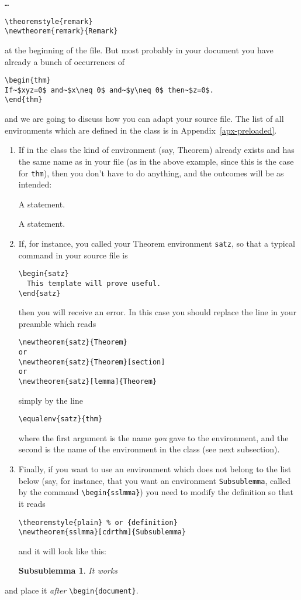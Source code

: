\documentclass[IGT,Unicode]{cedram}
\begin{document}
\noindent\texttt{\dots}
\begin{verbatim}
\theoremstyle{remark}
\newtheorem{remark}{Remark}
\end{verbatim}
at the beginning of the file. But most probably in your document you have already a bunch of occurrences of
\begin{verbatim}
\begin{thm}
If~$xyz=0$ and~$x\neq 0$ and~$y\neq 0$ then~$z=0$.
\end{thm}
\end{verbatim}
and we are going to discuss how you can adapt your source file. The list of all environments which are defined in the class is in Appendix~\ref{apx-preloaded}.
\begin{enumerate}
\item \label{equal} If in the class the kind of environment (say, Theorem) already exists and has the same name as in your file (as in the above example, since this is the case for \verb|thm|), then you don't have to do anything, and the outcomes will be as intended:
  \begin{thm}\label{thm:1}
   A statement. 
  \end{thm}
  \begin{prop}\label{prop:1}
   A statement. 
  \end{prop}
\item \label{equalenv} If, for instance, you called your Theorem environment \verb|satz|, so that a typical command in your source file is
\begin{verbatim}
\begin{satz}
  This template will prove useful.
\end{satz}
\end{verbatim}
  then you will receive an error. In this case you should replace the
  line in your preamble which reads
\begin{verbatim}
\newtheorem{satz}{Theorem}
or
\newtheorem{satz}{Theorem}[section]
or
\newtheorem{satz}[lemma]{Theorem}
\end{verbatim}
simply by the line
\begin{verbatim}
\equalenv{satz}{thm}
\end{verbatim}
where the first argument is the name \emph{you} gave to the
environment, and the second is the name of the environment in the
class (see next subsection).
\item \label{cdrthm} Finally, if you want to use an environment which
  does not belong to the list below (say, for instance, that you want
  an environment \verb|Subsublemma|, called by the command
  \verb|\begin{sslmma}|) you need to modify the definition so that it
    reads
\begin{verbatim}
\theoremstyle{plain} % or {definition}
\newtheorem{sslmma}[cdrthm]{Subsublemma}
\end{verbatim}
and it will look like this:
\theoremstyle{plain} %
\newtheorem{sslmma}[cdrthm]{Subsublemma}
\begin{sslmma}
  It works
\end{sslmma}
  \end{enumerate}
  and place it \emph{after} \verb|\begin{document}|.
\end{document}
